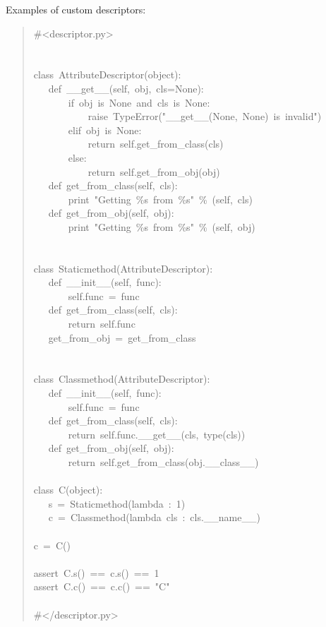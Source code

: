 \documentclass[10pt,a4paper,english]{article}
\begin{document}
Examples of custom descriptors:
\begin{quote}{\ttfamily \raggedright \noindent
{\#}<descriptor.py>~\\
~\\
~\\
class~AttributeDescriptor(object):~\\
~~~def~{\_}{\_}get{\_}{\_}(self,~obj,~cls=None):~\\
~~~~~~~if~obj~is~None~and~cls~is~None:~\\
~~~~~~~~~~~raise~TypeError("{\_}{\_}get{\_}{\_}(None,~None)~is~invalid")~\\
~~~~~~~elif~obj~is~None:~\\
~~~~~~~~~~~return~self.get{\_}from{\_}class(cls)~\\
~~~~~~~else:~\\
~~~~~~~~~~~return~self.get{\_}from{\_}obj(obj)~\\
~~~def~get{\_}from{\_}class(self,~cls):~\\
~~~~~~~print~"Getting~{\%}s~from~{\%}s"~{\%}~(self,~cls)~\\
~~~def~get{\_}from{\_}obj(self,~obj):~\\
~~~~~~~print~"Getting~{\%}s~from~{\%}s"~{\%}~(self,~obj)~\\
~\\
~\\
class~Staticmethod(AttributeDescriptor):~\\
~~~def~{\_}{\_}init{\_}{\_}(self,~func):~\\
~~~~~~~self.func~=~func~\\
~~~def~get{\_}from{\_}class(self,~cls):~\\
~~~~~~~return~self.func~\\
~~~get{\_}from{\_}obj~=~get{\_}from{\_}class~\\
~\\
~\\
class~Classmethod(AttributeDescriptor):~\\
~~~def~{\_}{\_}init{\_}{\_}(self,~func):~\\
~~~~~~~self.func~=~func~\\
~~~def~get{\_}from{\_}class(self,~cls):~\\
~~~~~~~return~self.func.{\_}{\_}get{\_}{\_}(cls,~type(cls))~\\
~~~def~get{\_}from{\_}obj(self,~obj):~\\
~~~~~~~return~self.get{\_}from{\_}class(obj.{\_}{\_}class{\_}{\_})~\\
~\\
class~C(object):~\\
~~~s~=~Staticmethod(lambda~:~1)~\\
~~~c~=~Classmethod(lambda~cls~:~cls.{\_}{\_}name{\_}{\_})~\\
~\\
c~=~C()~\\
~\\
assert~C.s()~==~c.s()~==~1~\\
assert~C.c()~==~c.c()~==~"C"~\\
~\\
{\#}</descriptor.py>
}\end{quote}
\end{document}
